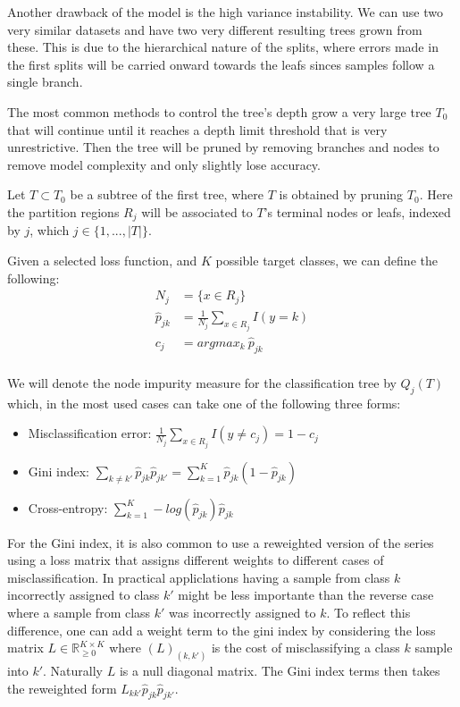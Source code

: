 \documentclass{article}%
\theoremstyle{definition}
\begin{document}
Another drawback of the model is the high variance instability. We can use two very similar datasets and have two very different resulting trees grown from these. This is due to the hierarchical nature of the splits, where errors made in the first splits will be carried onward towards the leafs sinces samples follow a single branch.

The most common methods to control the tree's depth grow a very large tree $T_0$ that will continue until it reaches a depth limit threshold that is very unrestrictive. Then the tree will be pruned by removing branches and nodes to remove model complexity and only slightly lose accuracy. 

Let $T \subset T_0$ be a subtree of the first tree, where $T$ is obtained by pruning $T_0$.  Here the partition regions $R_j$ will be associated to $T$'s terminal nodes or leafs, indexed by $j$, which $j \in \{1,...,|T|  \}$. 

Given a selected loss function, and $K$ possible target classes, we can define the following:
\begin{equation}
\begin{split}
N_j & =  \{x \in R_j \}\\
\hat{p}_{jk} & = \frac{1}{N_j} \sum_{x \in R_j}  I(y=k)\\
c_j & =  argmax_{k} \  \hat{p}_{jk} \\
\end{split}
\end{equation}\label{decisionTreePruneParameters}

We will denote the node impurity measure for the classification tree by $Q_j(T)$ which, in the most used cases can take one of the following three forms:

\begin{itemize}
	\item Misclassification error: $ \displaystyle \frac{1}{N_j} \sum_{x \in R_j}  I(y\neq c_j)  = 1 - c_j $
	\item Gini index: $ \displaystyle \sum_{k\neq k'} \hat{p}_{jk} \hat{p}_{jk'}   = \sum_{k=1}^{K} \hat{p}_{jk} (1 - \hat{p}_{jk})  $
	\item Cross-entropy: $ \displaystyle \sum_{k=1}^{K} -log(\hat{p}_{jk})\hat{p}_{jk} $
\end{itemize}


For the Gini index, it is also common to use a reweighted version of the series using a loss matrix that assigns different weights to different cases of misclassification. In practical appliclations having a sample from class $k$ incorrectly assigned to class $k'$ might be less importante than the reverse case where a sample from class $k'$ was incorrectly assigned to $k$. To reflect this difference, one can add a weight term to the gini index by considering the loss matrix $L \in \mathbb R_{\ge 0}^{K \times K}$ where $(L)_{(k,k')}$ is the cost of misclassifying a class $k$ sample into $k'$. Naturally $L$ is a null diagonal matrix.  The Gini index terms then takes the reweighted form  $L_{kk'} \hat{p}_{jk} \hat{p}_{jk'}$.
\end{document}
